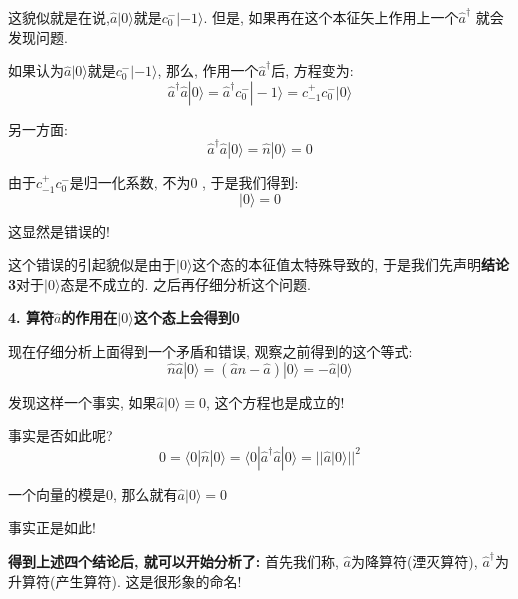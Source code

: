 \documentclass[a4paper, 11pt]{article}
\begin{document}
\begin{spacing}{1.2}
        这貌似就是在说,$\hat{a}|0\rangle$就是$c_{0}^{-}|-1\rangle$. 但是, 如果再在这个本征矢上作用上一个$\hat{a}^{\dagger}$
        就会发现问题. 

        如果认为$\hat{a}|0\rangle$就是$c_{0}^{-}|-1\rangle$, 那么, 作用一个$\hat{a}^{\dagger}$后, 方程变为:
        \begin{equation}
          \hat{a}^{\dagger}\hat{a}|0\rangle = \hat{a}^{\dagger}c_{0}^{-}|-1\rangle %
              = c_{-1}^{+}c_{0}^{-}|0\rangle
        \end{equation}

        另一方面:
        \begin{equation}
          \hat{a}^{\dagger}\hat{a}|0\rangle = \hat{n}|0\rangle = 0
        \end{equation}

        由于$c_{-1}^{+}c_{0}^{-}$是归一化系数, 不为0 , 于是我们得到:
        \begin{equation}
          |0\rangle = 0
        \end{equation}

        这显然是错误的!

        这个错误的引起貌似是由于$|0\rangle$这个态的本征值太特殊导致的, 于是我们先声明\textbf{结论3}对于$|0\rangle$态是不成立的. 
        之后再仔细分析这个问题. 

        \textbf{4. 算符$\hat{a}$的作用在$|0\rangle$这个态上会得到0}

        现在仔细分析上面得到一个矛盾和错误, 观察之前得到的这个等式:
        \begin{equation*}
        \hat{n}\hat{a}|0\rangle = (\hat{a}\hat{n}-\hat{a})|0\rangle = -\hat{a}|0\rangle
        \end{equation*}

        发现这样一个事实, 如果$\hat{a}|0\rangle\equiv0$, 这个方程也是成立的!

        事实是否如此呢?
        \begin{equation}
          0 = \langle0|\hat{n}|0\rangle = \langle0|\hat{a}^{\dagger}\hat{a}|0\rangle = %
          \big|\big|\hat{a}|0\rangle\big|\big|^2
        \end{equation}

        一个向量的模是$0$, 那么就有$\hat{a}|0\rangle = 0$

        事实正是如此!

        \textbf{得到上述四个结论后, 就可以开始分析了:}
        首先我们称, $\hat{a}$为降算符(湮灭算符), $\hat{a}^{\dagger}$为升算符(产生算符). 这是很形象的命名!


\end{spacing}
\end{document}
